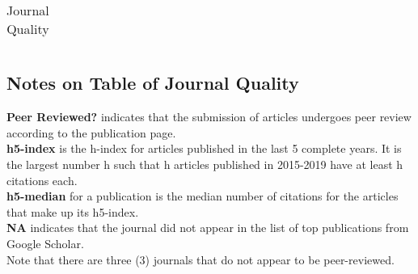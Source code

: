 \begin{longtable}{|>{\raggedright\arraybackslash}p{3.7cm}|l|c|r|r|}
    \caption{Journal Quality}
\end{longtable}

\subsection{Notes on Table of Journal Quality}

{\bf Peer Reviewed?} indicates that the submission of articles undergoes peer review according to the publication page. \\

{\bf h5-index} is the h-index for articles published in the last 5 complete years. It is the largest number h such that h articles published in 2015-2019 have at least h citations each. \\

{\bf h5-median} for a publication is the median number of citations for the articles that make up its h5-index. \\

{\bf NA} indicates that the journal did not appear in the list of top publications from Google Scholar.\\

Note that there are three (3) journals that do not appear to be peer-reviewed. \\

